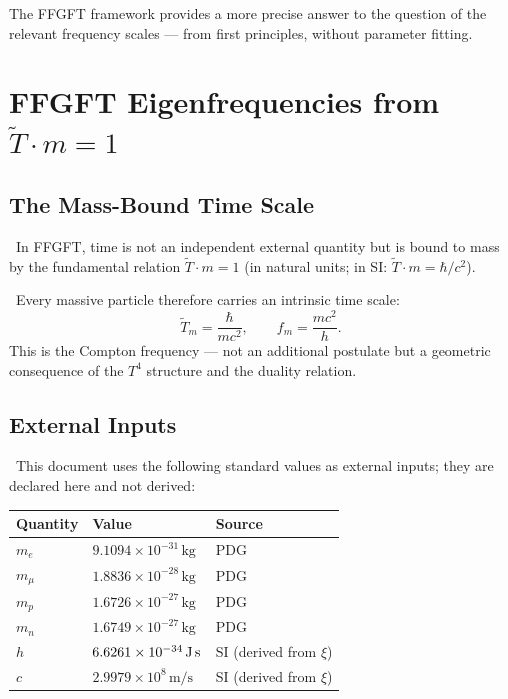 The FFGFT framework provides a more precise answer to the question of
the relevant frequency scales --- from first principles, without parameter
fitting.

\section{FFGFT Eigenfrequencies from $\tilde{T}\cdot m=1$}

\subsection{The Mass-Bound Time Scale}

\SetzM\ In FFGFT, time is not an independent external quantity but is bound to
mass by the fundamental relation $\tilde{T}\cdot m=1$ (in natural units;
in SI: $\tilde{T}\cdot m = \hbar/c^2$).

\KM\ Every massive particle therefore carries an intrinsic time scale:
\begin{equation}
\tilde{T}_m = \frac{\hbar}{mc^2}, \qquad f_m = \frac{mc^2}{h}.
\label{eq:comptonfrequency}
\end{equation}
This is the Compton frequency --- not an additional postulate but a geometric
consequence of the $T^4$ structure and the duality relation.

\subsection{External Inputs}

\SetzM\ This document uses the following standard values as external inputs;
they are declared here and not derived:

\begin{center}
\begin{tabular}{lll}
\toprule
Quantity & Value & Source \\
\midrule
$m_e$   & $9.1094\times10^{-31}\,\text{kg}$ & PDG \\
$m_\mu$ & $1.8836\times10^{-28}\,\text{kg}$ & PDG \\
$m_p$   & $1.6726\times10^{-27}\,\text{kg}$ & PDG \\
$m_n$   & $1.6749\times10^{-27}\,\text{kg}$ & PDG \\
$h$     & $6.6261\times10^{-34}\,\text{J\,s}$ & SI (derived from $\xi$) \\
$c$     & $2.9979\times10^{8}\,\text{m/s}$  & SI (derived from $\xi$) \\
\bottomrule
\end{tabular}
\end{center}

